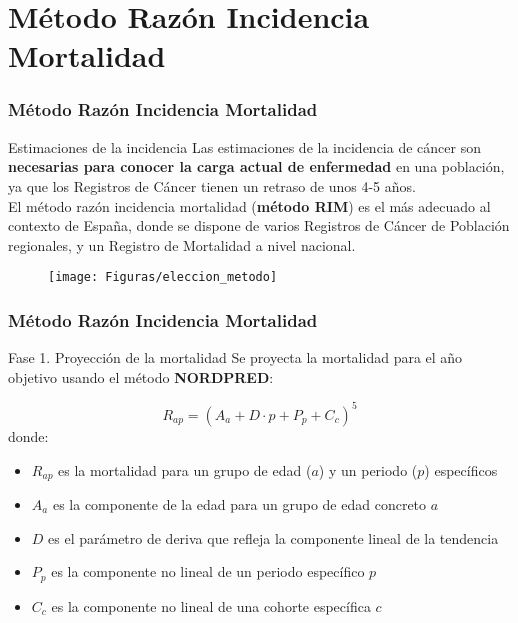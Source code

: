 \documentclass{beamer}
\begin{document}
\section{Método Razón Incidencia Mortalidad}
\begin{frame}\frametitle{Método Razón Incidencia Mortalidad}

	\begin{block}{Estimaciones de la incidencia}
		Las estimaciones de la incidencia de cáncer son \textbf{necesarias para conocer la carga actual de enfermedad} en una población, ya que los Registros de Cáncer tienen un retraso de unos 4-5 años.\\[2ex]
		
	El método razón incidencia mortalidad (\textbf{método RIM}) es el más adecuado al contexto de España, donde se dispone de varios Registros de Cáncer de Población regionales, y un Registro de Mortalidad a nivel nacional.
	\end{block}
\vspace{-5pt}
	\begin{figure}
		\centering
		\texttt{[image: Figuras/eleccion\_metodo]}
	\end{figure}
\vspace{-15pt}


\end{frame}


\begin{frame}\frametitle{Método Razón Incidencia Mortalidad}

		\begin{block}{Fase 1. Proyección de la mortalidad}
			Se proyecta la mortalidad para el año objetivo usando el método \textbf{NORDPRED}:
			
			$$R_{ap} = {(A_a + D\cdot p + P_p + C_c)}^5$$ donde:
			
			\begin{itemize}
				\item $R_{ap}$ es la mortalidad para un grupo de edad ($a$) y un periodo ($p$) específicos
				\item $A_a$ es la componente de la edad para un grupo de edad concreto $a$
				\item $D$ es el parámetro de deriva que refleja la componente lineal de la tendencia
				\item $P_p$ es la componente no lineal de un periodo específico $p$
				\item $C_c$ es la componente no lineal de una cohorte específica $c$
			\end{itemize}
		\end{block}


\end{frame}
\end{document}
